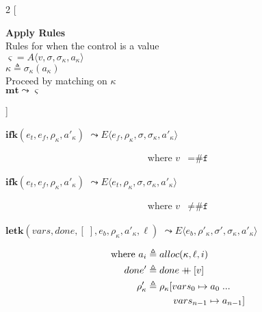 \documentclass[12pt,draft]{article}
\newcommand\mdoubleplus{\ensuremath{\mathbin{+\mkern-9mu+}}}
\newcommand{\falsesyn}{\texttt{\#f}}
\begin{document}
\begin{multicols*}{2}
[
\begin{center}
\textbf{Apply Rules} \\
Rules for when the control is a value \\
$\varsigma = A\langle v , \sigma , \sigma_\kappa , a_\kappa \rangle$ \\
$\kappa \triangleq \sigma_\kappa(a_\kappa)$ \\
Proceed by matching on $\kappa$ \\
\vspace{5mm}
$\textbf{mt} \leadsto \varsigma$
\end{center}
\vspace{-5mm}
]
\begin{center}
  $\textbf{ifk}(e_t, e_f, \rho_\kappa , a'_\kappa)$
  $\leadsto E\langle e_f , \rho_\kappa , \sigma , \sigma_\kappa , a'_\kappa \rangle$
\end{center}
\vspace{-7mm}
\begin{align*}
\text{where } v &= \falsesyn
\end{align*}
\begin{center}
  $\textbf{ifk}(e_t, e_f, \rho_\kappa , a'_\kappa)$
  $\leadsto E\langle e_t , \rho_\kappa , \sigma , \sigma_\kappa , a'_\kappa \rangle$
\end{center}
\vspace{-7mm}
\begin{align*}
\text{where } v &\not= \falsesyn
\end{align*}
\begin{center}
  $\textbf{letk}(vars, done, [\;], e_b, \rho_\kappa , a'_\kappa, \ell)$
  $\leadsto E\langle e_b , \rho'_\kappa , \sigma' , \sigma_\kappa , a'_\kappa \rangle $
\end{center}
\vspace{-7mm}
\begin{align*}
  \text{where } a_i &\triangleq alloc(\kappa, \ell, i) \\
  done' &\triangleq done \mdoubleplus [v] \\
  \rho'_{\kappa} &\triangleq \rho_{\kappa}[vars_0 \mapsto a_0\;...\\
                    &\;\;\;\;\;\;\;\;\;\;  vars_{n-1} \mapsto a_{n-1}] \\

\end{align*}
\end{multicols*}
\end{document}
